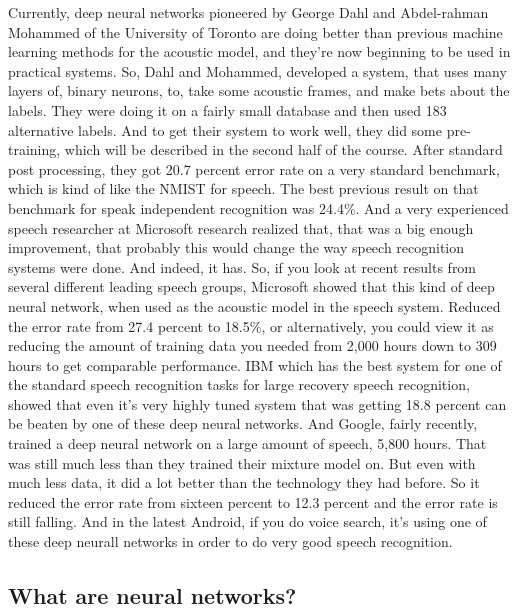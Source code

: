 \begin{multicols}{2}
\begin{footnotesize}
Currently, deep neural networks pioneered by George Dahl and Abdel-rahman Mohammed of the University of Toronto are doing better than previous machine learning methods for the acoustic model, and they're now beginning to be used in practical systems. So, Dahl and Mohammed, developed a system, that uses many layers of, binary neurons, to, take some acoustic frames, and make bets about the labels. They were doing it on a fairly small database and then used 183 alternative labels. And to get their system to work well, they did some pre-training, which will be described in the second half of the course. After standard post processing, they got 20.7 percent error rate on a very standard benchmark, which is kind of like the NMIST for speech. The best previous result on that benchmark for speak independent recognition was 24.4\%. And a very experienced speech researcher at Microsoft research realized that, that was a big enough improvement, that probably this would change the way speech recognition systems were done. And indeed, it has. So, if you look at recent results from several different leading speech groups, Microsoft showed that this kind of deep neural network, when used as the acoustic model in the speech system. Reduced the error rate from 27.4 percent to 18.5\%, or alternatively, you could view it as reducing the amount of training data you needed from 2,000 hours down to 309 hours to get comparable performance. IBM which has the best system for one of the standard speech recognition tasks for large recovery speech recognition, showed that even it's very highly tuned system that was getting 18.8 percent can be beaten by one of these deep neural networks. And Google, fairly recently, trained a deep neural network on a large amount of speech, 5,800 hours. That was still much less than they trained their mixture model on. But even with much less data, it did a lot better than the technology they had before. So it reduced the error rate from sixteen percent to 12.3 percent and the error rate is still falling. And in the latest Android, if you do voice search, it's using one of these deep neurall networks in order to do very good speech recognition.
\end{footnotesize}
\end{multicols}


\subsection{What are neural networks?}

